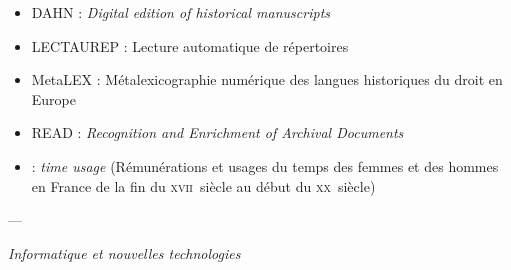 \begin{itemize}
    \item DAHN : \textit{Digital edition of historical manuscripts}
    \item LECTAUREP : Lecture automatique de répertoires
    \item MetaLEX : Métalexicographie numérique des langues historiques du
droit en Europe
    \item READ : \textit{Recognition and Enrichment of Archival Documents}
    \item \timeus{} :\textit{ time usage} (Rémunérations et usages du temps des femmes et des hommes en France de la fin du \textsc{xvii}\ieme ~siècle au début du \textsc{xx}\ieme ~siècle)
\end{itemize}

\begin{center}---

\bigbreak

\textit{Informatique et nouvelles technologies}
\end{center} 

\bigbreak

